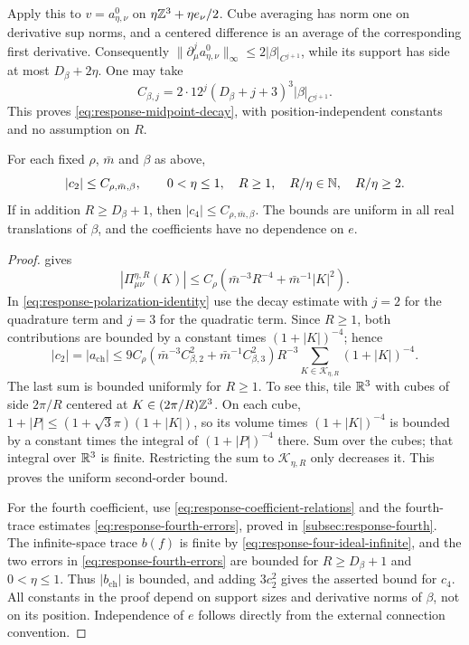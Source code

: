 Apply this to $v=a_{\eta,\nu}^0$ on
$\eta\mathbb Z^3+\eta e_\nu/2$. Cube averaging has norm one on
derivative sup norms, and a centered difference is an average
of the corresponding first derivative. Consequently
$\|\partial_\mu^ja_{\eta,\nu}^0\|_\infty
\le2|\beta|_{C^{j+1}}$, while its support has side at most
$D_\beta+2\eta$. One may take
\[
 C_{\beta,j}=2\cdot12^j(D_\beta+j+3)^3|\beta|_{C^{j+1}}.
\]
This proves \eqref{eq:response-midpoint-decay}, with position-independent
constants and no assumption on $R$.

\begin{proposition}\label{prop:response-uniform-coefficients}
For each fixed $\rho$, $\bar m$ and $\beta$ as above,
\[
 |c_2|\le C_{\rho,\bar m,\beta},
              \qquad 0<\eta\le1,\quad R\ge1,\quad
                         R/\eta\in\mathbb N,\quad R/\eta\ge2.
\]
If in addition $R\ge D_\beta+1$, then
$|c_4|\le C_{\rho,\bar m,\beta}$.
The bounds are uniform in all real translations of $\beta$,
and the coefficients have no dependence on $e$.
\end{proposition}

\begin{proof}
 gives
\[
 |\Pi^{\eta,R}_{\mu\nu}(K)|
   \le C_\rho(\bar m^{-3}R^{-4}+\bar m^{-1}|K|^2).
\]
In \eqref{eq:response-polarization-identity} use the decay
estimate with $j=2$ for the quadrature term and $j=3$ for
the quadratic term. Since $R\ge1$, both contributions are
bounded by a constant times $(1+|K|)^{-4}$; hence
\[
 |c_2|=|a_{\mathrm{ch}}|
 \le9C_\rho
       (\bar m^{-3}C_{\beta,2}^2+\bar m^{-1}C_{\beta,3}^2)
       R^{-3}\sum_{K\in\mathcal K_{\eta,R}}(1+|K|)^{-4}.
\]
The last sum is bounded uniformly for $R\ge1$. To see this,
tile $\mathbb R^3$ with cubes of side $2\pi/R$ centered at
$K\in(2\pi/R)\mathbb Z^3$. On each cube,
$1+|P|\le(1+\sqrt3\pi)(1+|K|)$, so its volume times
$(1+|K|)^{-4}$ is bounded by a constant times the integral
of $(1+|P|)^{-4}$ there. Sum over the cubes; that integral
over $\mathbb R^3$ is finite. Restricting the sum to
$\mathcal K_{\eta,R}$ only decreases it. This proves the
uniform second-order bound.

For the fourth coefficient, use
\eqref{eq:response-coefficient-relations} and
the fourth-trace estimates \eqref{eq:response-fourth-errors}, proved in \cref{subsec:response-fourth}. The infinite-space
trace $b(f)$ is finite by \eqref{eq:response-four-ideal-infinite},
and the two errors in \eqref{eq:response-fourth-errors} are
bounded for $R\ge D_\beta+1$ and $0<\eta\le1$.
Thus $|b_{\mathrm{ch}}|$ is bounded, and adding $3c_2^2$
gives the asserted bound for $c_4$. All constants in the
proof depend on support sizes and derivative norms of $\beta$,
not on its position. Independence of $e$ follows directly
from the external connection convention.
\end{proof}



